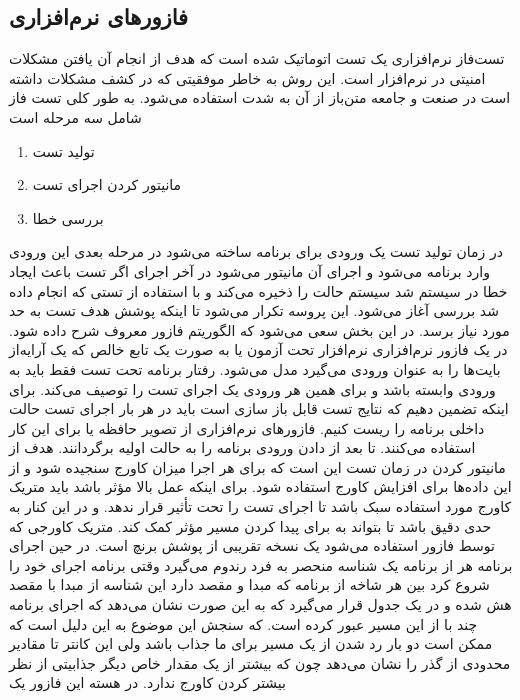 \documentclass[conference]{IEEEtran}
\begin{document}
\subsection{فازور‌های نرم‌افزاری}
تست‌فاز نرم‌افزاری یک تست اتوماتیک شده است که هدف از انجام آن یافتن مشکلات امنیتی
در نرم‌افزار است. این روش به خاطر موفقیتی که در کشف مشکلات داشته است در صنعت
و جامعه متن‌باز از آن به شدت استفاده می‌شود.
به طور کلی تست فاز شامل سه مرحله است
\begin{enumerate}
    \item تولید تست
    \item مانیتور کردن اجرای تست
    \item بررسی خطا
\end{enumerate}
در زمان تولید تست یک ورودی برای برنامه ساخته می‌شود در مرحله بعدی این ورودی وارد برنامه می‌شود
و اجرای آن مانیتور می‌شود
در آخر اجرای اگر تست باعث ایجاد خطا در سیستم شد سیستم حالت را ذخیره می‌کند
و با استفاده از تستی که انجام داده شد بررسی آغاز می‌شود.
این پروسه تکرار می‌شود تا اینکه پوشش هدف تست به حد مورد نیاز برسد.
در این بخش سعی می‌شود که الگوریتم فازور معروف
شرح داده شود.
در یک فازور نرم‌افزاری
نرم‌افزار تحت آزمون یا
به صورت یک تابع خالص که یک آرایه‌از بایت‌ها را به عنوان ورودی می‌گیرد مدل می‌شود.
رفتار برنامه تحت تست فقط باید به ورودی وابسته باشد و برای همین هر ورودی
یک اجرای تست را توصیف می‌کند.
برای اینکه تضمین دهیم که نتایج تست قابل باز سازی است باید در هر بار اجرای تست
حالت داخلی برنامه را ریست کنیم. فازور‌های نرم‌افزاری از تصویر حافظه یا
برای این کار استفاده می‌کنند.
تا بعد از دادن ورودی برنامه را به حالت اولیه برگردانند.
هدف از مانیتور کردن در زمان تست این است که برای هر اجرا میزان کاورج سنجیده شود
و از این داده‌ها برای افزایش کاورج استفاده شود.
برای اینکه عمل بالا مؤثر باشد باید متریک کاورج مورد استفاده سبک باشد تا اجرای تست را
تحت تأثیر قرار ندهد.
و در این کنار به حدی دقیق باشد تا بتواند به
برای پیدا کردن مسیر مؤثر کمک کند.
متریک کاورجی که توسط فازور
استفاده می‌شود یک نسخه تقریبی از پوشش برنچ است.
در حین اجرای برنامه هر
از برنامه یک شناسه منحصر به فرد رندوم می‌گیرد
وقتی برنامه اجرای خود را شروع کرد بین هر شاخه از برنامه که مبدا و مقصد دارد
این شناسه از مبدا با مقصد هش شده و در یک جدول قرار می‌گیرد
که به این صورت نشان می‌دهد که اجرای برنامه چند با از این مسیر عبور کرده است.
که سنجش این موضوع به این دلیل است که ممکن است دو بار رد شدن از یک مسیر برای ما جذاب باشد
ولی این کانتر تا مقادیر محدودی از گذر را نشان می‌دهد چون که بیشتر از یک مقدار خاص دیگر جذابیتی از نظر
بیشتر کردن کاورج ندارد.
در هسته این فازور یک
\end{document}
